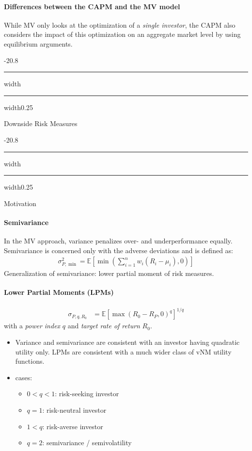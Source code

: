 \documentclass[a4paper,landscape,8pt,fleqn]{scrartcl}
\makeatletter
\renewcommand{\section}{\@startsection{section}{1}{0mm}%
{-2\baselineskip}{0.8\baselineskip}%
{\hrule depth 0.2pt width\columnwidth\hrule depth1.5pt
width0.25\columnwidth\vspace*{1.2em}\Large\bfseries}}
\renewcommand{\subsection}{\@startsection{subsection}{1}{0mm}%
{-2\baselineskip}{0.8\baselineskip}%
{\hrule depth 0.2pt width\columnwidth\hrule depth0.75pt
width0.25\columnwidth\vspace*{1.2em}\large\bfseries}}
\makeatother
\begin{document}
\begin{multicols*}{3}
\paragraph{Differences between the CAPM and the MV model}
While MV only looks at the optimization of a \textit{single investor}, the CAPM also considers the impact of this optimization on an aggregate market level by using equilibrium arguments.

\section{Downside Risk Measures}

\subsection{Motivation}

\paragraph{Semivariance}
In the MV approach, variance penalizes over- and underperformance equally. \\
Semivariance is concerned only with the adverse deviations and is defined as:
\begin{align*}
\sigma_{P,\min}^2 = \mathbb{E} \left[ \min \left( \sum_{i=1}^n w_i (R_i - \mu_i), 0 \right) \right]
\end{align*}
Generalization of semivariance: lower partial moment of risk measures.

\paragraph{Lower Partial Moments (LPMs)}
\begin{align*}
\sigma_{P,q,R_0} &= \mathbb{E} \left[ \max(R_0 - R_P,0)^q \right]^{1/q}
\end{align*}
with a \textit{power index} $q$ and \textit{target rate of return} $R_0$.
\begin{itemize}
\item Variance and semivariance are consistent with an investor having quadratic utility only. LPMs are consistent with a much wider class of vNM utility functions.
\item cases:
\begin{itemize}
\item $0 < q < 1$: risk-seeking investor
\item $q=1$: risk-neutral investor
\item $1 < q$: risk-averse investor
\item $q=2$: semivariance / semivolatility
\end{itemize}
\end{itemize}


\end{multicols*}
\end{document}
